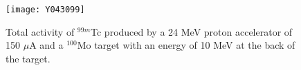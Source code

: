 \begin{figure}
\centering\texttt{[image: Y043099]}
\caption{Total activity of $^{99m}$Tc produced by a 24 MeV proton accelerator of 
150 $\mu$A and a $^{100}$Mo target with an energy of 10 MeV at the back of the 
target.}
\label{tc99m}
\end{figure}
